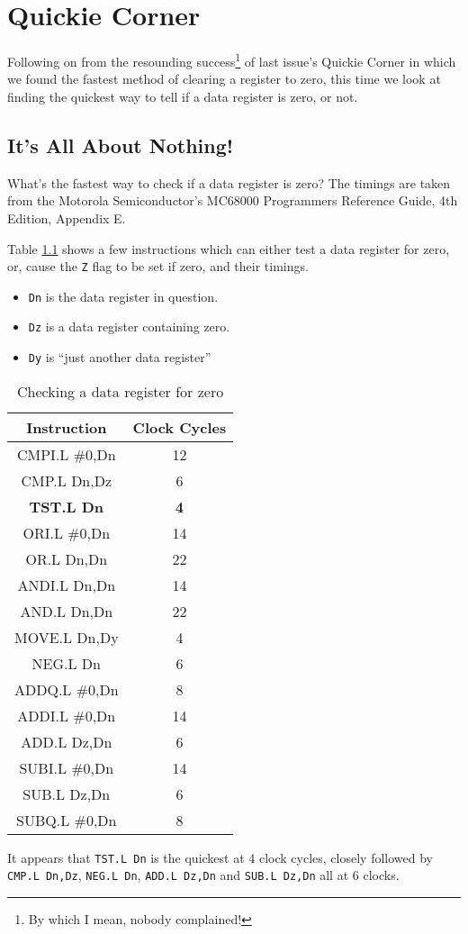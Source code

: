 
\chapter{Quickie Corner}

Following on from the resounding success\footnote{By which I mean, nobody complained!}
of last issue's Quickie Corner in which we found the fastest method
of clearing a register to zero, this time we look at finding the quickest
way to tell if a data register is zero, or not.

\section{It's All About Nothing!}

What's the fastest way to check if a data register is zero? The timings
are taken from the Motorola Semiconductor's MC68000 Programmers Reference
Guide, 4th Edition, Appendix E.

Table \ref{tab:Checking-a-data-register-for-zero} shows a few instructions
which can either test a data register for zero, or, cause the \texttt{Z}
flag to be set if zero, and their timings.
\begin{itemize}
\item \texttt{Dn} is the data register in question.
\item \texttt{Dz} is a data register containing zero.
\item \texttt{Dy} is ``just another data register''
\end{itemize}
\begin{table}[!h]
\begin{centering}
\begin{tabular}{|c|c|}
\hline 
\textbf{Instruction} & \textbf{Clock Cycles}\tabularnewline
\hline 
\hline 
CMPI.L \#0,Dn & 12\tabularnewline
\hline 
CMP.L Dn,Dz & 6\tabularnewline
\hline 
\textbf{TST.L Dn} & \textbf{4}\tabularnewline
\hline 
ORI.L \#0,Dn & 14\tabularnewline
\hline 
OR.L Dn,Dn & 22\tabularnewline
\hline 
ANDI.L Dn,Dn & 14\tabularnewline
\hline 
AND.L Dn,Dn & 22\tabularnewline
\hline 
MOVE.L Dn,Dy & 4\tabularnewline
\hline 
NEG.L Dn & 6\tabularnewline
\hline 
ADDQ.L \#0,Dn & 8\tabularnewline
\hline 
ADDI.L \#0,Dn & 14\tabularnewline
\hline 
ADD.L Dz,Dn & 6\tabularnewline
\hline 
SUBI.L \#0,Dn & 14\tabularnewline
\hline 
SUB.L Dz,Dn & 6\tabularnewline
\hline 
SUBQ.L \#0,Dn & 8\tabularnewline
\hline 
\end{tabular}
\par\end{centering}
\caption{Checking a data register for zero\label{tab:Checking-a-data-register-for-zero}}

\end{table}

It appears that \texttt{TST.L Dn} is the quickest at 4 clock cycles,
closely followed by \texttt{CMP.L Dn,Dz}, \texttt{NEG.L Dn}, \texttt{ADD.L
Dz,Dn} and \texttt{SUB.L Dz,Dn} all at 6 clocks.
